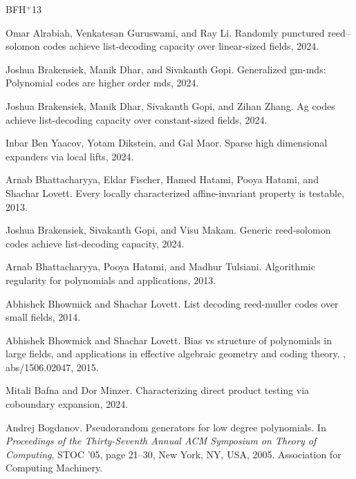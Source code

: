 \documentclass[10pt,a4paper]{article}
\begin{document}
\newcommand{\etalchar}[1]{$^{#1}$}
\begin{thebibliography}{BFH{\etalchar{+}}13}

Omar Alrabiah, Venkatesan Guruswami, and Ray Li.
\newblock Randomly punctured reed--solomon codes achieve list-decoding capacity
  over linear-sized fields, 2024.

Joshua Brakensiek, Manik Dhar, and Sivakanth Gopi.
\newblock Generalized gm-mds: Polynomial codes are higher order mds, 2024.

Joshua Brakensiek, Manik Dhar, Sivakanth Gopi, and Zihan Zhang.
\newblock Ag codes achieve list-decoding capacity over constant-sized fields,
  2024.

Inbar {Ben Yaacov}, Yotam Dikstein, and Gal Maor.
\newblock Sparse high dimensional expanders via local lifts, 2024.

\bibitem[BFH{\etalchar{+}}13]{bhattacharyya2013locally}
Arnab Bhattacharyya, Eldar Fischer, Hamed Hatami, Pooya Hatami, and Shachar
  Lovett.
\newblock Every locally characterized affine-invariant property is testable,
  2013.

Joshua Brakensiek, Sivakanth Gopi, and Visu Makam.
\newblock Generic reed-solomon codes achieve list-decoding capacity, 2024.

Arnab Bhattacharyya, Pooya Hatami, and Madhur Tulsiani.
\newblock Algorithmic regularity for polynomials and applications, 2013.

Abhishek Bhowmick and Shachar Lovett.
\newblock List decoding reed-muller codes over small fields, 2014.

Abhishek Bhowmick and Shachar Lovett.
\newblock Bias vs structure of polynomials in large fields, and applications in
  effective algebraic geometry and coding theory.
, abs/1506.02047, 2015.

Mitali Bafna and Dor Minzer.
\newblock Characterizing direct product testing via coboundary expansion, 2024.

Andrej Bogdanov.
\newblock Pseudorandom generators for low degree polynomials.
\newblock In {\em Proceedings of the Thirty-Seventh Annual ACM Symposium on
  Theory of Computing}, STOC '05, page 21–30, New York, NY, USA, 2005.
  Association for Computing Machinery.


\end{thebibliography}
\end{document}

